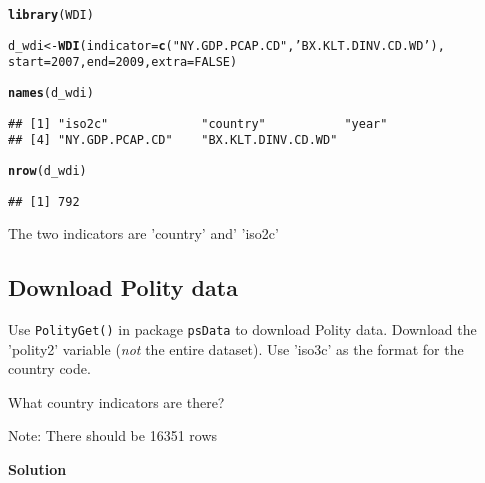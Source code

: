 \documentclass{article}\usepackage[]{graphicx}\usepackage[]{color}
\makeatletter
\newcommand{\hlnum}[1]{\textcolor[rgb]{0.686,0.059,0.569}{#1}}%
\newcommand{\hlstr}[1]{\textcolor[rgb]{0.192,0.494,0.8}{#1}}%
\newcommand{\hlstd}[1]{\textcolor[rgb]{0.345,0.345,0.345}{#1}}%
\newcommand{\hlkwb}[1]{\textcolor[rgb]{0.69,0.353,0.396}{#1}}%
\newcommand{\hlkwc}[1]{\textcolor[rgb]{0.333,0.667,0.333}{#1}}%
\newcommand{\hlkwd}[1]{\textcolor[rgb]{0.737,0.353,0.396}{\textbf{#1}}}%
\newenvironment{kframe}{%
 \def\at@end@of@kframe{}%
 \ifinner\ifhmode%
  \def\at@end@of@kframe{\end{minipage}}%
  \begin{minipage}{\columnwidth}%
 \fi\fi%
 \def\FrameCommand##1{\hskip\@totalleftmargin \hskip-\fboxsep
 \colorbox{shadecolor}{##1}\hskip-\fboxsep
     \hskip-\linewidth \hskip-\@totalleftmargin \hskip\columnwidth}%
 \MakeFramed {\advance\hsize-\width
   \@totalleftmargin\z@ \linewidth\hsize
   \@setminipage}}%
 {\par\unskip\endMakeFramed%
 \at@end@of@kframe}
\newenvironment{knitrout}{}{} %
\makeatother
\begin{document}
\begin{knitrout}
\color{fgcolor}\begin{kframe}
\begin{alltt}
\hlkwd{library}\hlstd{(WDI)}
\end{alltt}


{\ttfamily\noindent\itshape\color{messagecolor}{\#\# Loading required package: RJSONIO}}\begin{alltt}
\hlstd{d_wdi} \hlkwb{<-} \hlkwd{WDI}\hlstd{(}\hlkwc{indicator} \hlstd{=} \hlkwd{c}\hlstd{(}\hlstr{"NY.GDP.PCAP.CD"}\hlstd{,} \hlstr{'BX.KLT.DINV.CD.WD'}\hlstd{),}
             \hlkwc{start} \hlstd{=} \hlnum{2007}\hlstd{,} \hlkwc{end} \hlstd{=} \hlnum{2009}\hlstd{,} \hlkwc{extra} \hlstd{=} \hlnum{FALSE}\hlstd{)}

\hlkwd{names}\hlstd{(d_wdi)}
\end{alltt}
\begin{verbatim}
## [1] "iso2c"             "country"           "year"             
## [4] "NY.GDP.PCAP.CD"    "BX.KLT.DINV.CD.WD"
\end{verbatim}
\begin{alltt}
\hlkwd{nrow}\hlstd{(d_wdi)}
\end{alltt}
\begin{verbatim}
## [1] 792
\end{verbatim}
\end{kframe}
\end{knitrout}

The two indicators are 'country' and' 'iso2c'

\subsection{Download Polity data}

Use \verb`PolityGet()` in package \verb`psData` to download Polity data. Download the 'polity2' variable (\textit{not} the entire dataset). Use 'iso3c' as the format for the country code.

What country indicators are there?

Note: There should be 16351 rows

\textbf{Solution}
\end{document}

